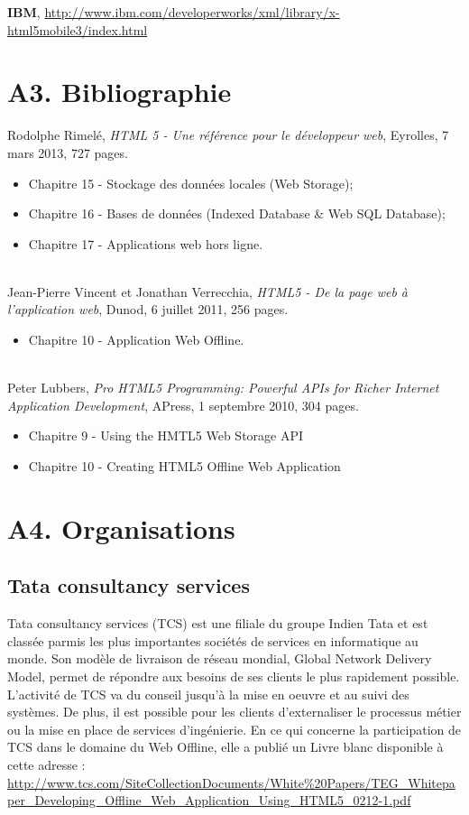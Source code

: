 	\textbf{IBM}, \url{http://www.ibm.com/developerworks/xml/library/x-html5mobile3/index.html}

\section{A3. Bibliographie}

	Rodolphe Rimelé, \textit{HTML 5 - Une référence pour le développeur web}, Eyrolles, 7 mars 2013, 727 pages.
	\begin{itemize}
		\item Chapitre 15 - Stockage des données locales (Web Storage);
		\item Chapitre 16 - Bases de données (Indexed Database \& Web SQL Database);
		\item Chapitre 17 - Applications web hors ligne.
	\end{itemize}
	~\\

	Jean-Pierre Vincent et Jonathan Verrecchia, \textit{HTML5 - De la page web à l'application web}, Dunod, 6 juillet 2011, 256 pages.
	\begin{itemize}
		\item Chapitre 10 - Application Web Offline.
	\end{itemize}
	~\\

	Peter Lubbers, \textit{Pro HTML5 Programming: Powerful APIs for Richer Internet Application Development}, APress, 1 septembre 2010, 304 pages.
	\begin{itemize}
		\item Chapitre 9 - Using the HMTL5 Web Storage API
		\item Chapitre 10 - Creating HTML5 Offline Web Application 
	\end{itemize}

\section{A4. Organisations}		

	\subsection{Tata consultancy services}
		Tata consultancy services (TCS) est une filiale du groupe Indien Tata et est classée parmis les plus importantes sociétés de services en informatique au monde. 
		Son modèle de livraison de réseau mondial, Global Network Delivery Model, permet de répondre aux besoins de ses clients le plus rapidement possible.
		L’activité de TCS va du conseil jusqu’à la mise en oeuvre et au suivi des systèmes. De plus, il est possible pour les clients d’externaliser le processus métier ou la mise en place de services d’ingénierie.
		En ce qui concerne la participation de TCS dans le domaine du Web Offline, elle a publié un Livre blanc disponible à cette adresse : 
		\url{http://www.tcs.com/SiteCollectionDocuments/White%20Papers/TEG_Whitepaper_Developing_Offline_Web_Application_Using_HTML5_0212-1.pdf}

